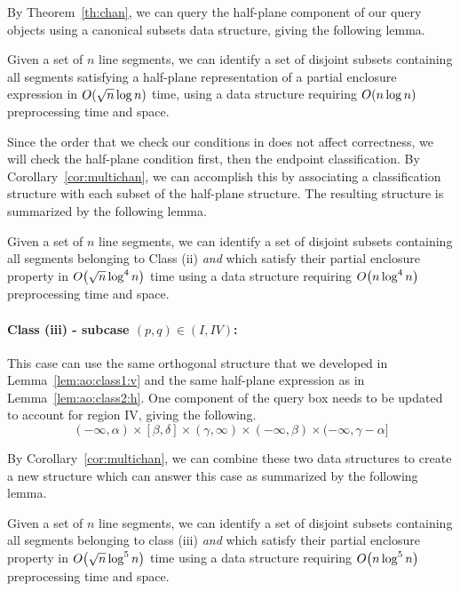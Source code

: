 By Theorem~\ref{th:chan}, we can query the half-plane component of our query 
objects using a canonical subsets data structure, giving the following lemma.

\begin{lemma}
\label{lem:ao:class2:h}
Given a set of $n$ line segments, we can identify a set of disjoint subsets 
containing all segments satisfying a half-plane representation of a partial 
enclosure expression in $O\!\left(\sqrt{n}\log{n}\right)$ time, using a data structure 
requiring $O\!\left(n\log{n}\right)$ preprocessing time and space.
\end{lemma}

Since the order that we check our conditions in does not affect correctness, we 
will check the half-plane condition first, then the endpoint classification.  
By Corollary~\ref{cor:multichan}, we can accomplish this by associating a 
classification structure with each subset of the half-plane structure. The 
resulting structure is summarized by the following lemma.

\begin{lemma}
\label{lem:ao:class2:c}
Given a set of $n$ line segments, we can identify a set of disjoint subsets 
containing all segments belonging to Class (ii) \emph{and} which satisfy their 
partial enclosure property in $O\!\left(\sqrt{n}\log^4{n}\right)$ time using a data 
structure requiring $O\!\left(n\log^4{n}\right)$ preprocessing time and space.
\end{lemma}


\paragraph{Class (iii) - subcase $(p, q) \in (I, IV)$:} 
This case can use the same orthogonal structure that we developed in 
Lemma~\ref{lem:ao:class1:v} and the same half-plane expression as in 
Lemma~\ref{lem:ao:class2:h}. 
One component of the query box needs to be updated to account for region IV, 
giving the following.
\[
(-\infty, \alpha) \times [\beta, \delta] \times (\gamma, \infty) \times 
(-\infty, \beta) \times (-\infty, \gamma - \alpha]
\]

By Corollary~\ref{cor:multichan}, we can combine these two data structures to 
create a new structure which can answer this case as summarized by the following 
lemma.

\begin{lemma}
\label{lem:ao:class3:c}
Given a set of $n$ line segments, we can identify a set of disjoint subsets 
containing all segments belonging to class (iii) \emph{and} which satisfy their 
partial enclosure property in $O\!\left(\sqrt{n}\log^5{n}\right)$ time using a data 
structure requiring $O\!\left(n\log^5{n}\right)$ preprocessing time and space.
\end{lemma}


